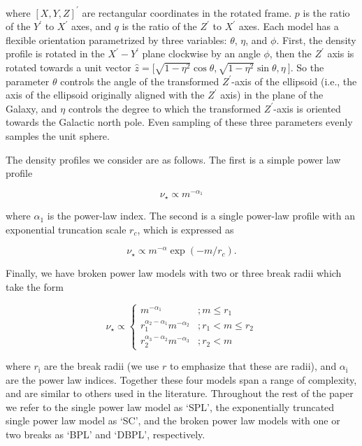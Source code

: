 \noindent where $[X,Y,Z]^{\prime}$ are rectangular coordinates in the rotated frame. $p$ is the ratio of the $Y^{\prime}$ to $X^{\prime}$ axes, and $q$ is the ratio of the $Z^{\prime}$ to $X^{\prime}$ axes. Each model has a flexible orientation parametrized by three variables: $\theta$, $\eta$, and $\phi$. First, the density profile is rotated in the $X^{\prime}-Y^{\prime}$ plane clockwise by an angle $\phi$, then the $Z^{\prime}$ axis is rotated towards a unit vector $\hat{z} = \big[ \sqrt{ 1-\eta^{2} } \cos\theta, \sqrt{ 1-\eta^{2} } \sin\theta, \eta \  \big]$. So the parameter $\theta$ controls the angle of the transformed $Z^{\prime}$-axis of the ellipsoid (i.e., the axis of the ellipsoid originally aligned with the $Z^{\prime}$ axis) in the plane of the Galaxy, and $\eta$ controls the degree to which the transformed $Z^{\prime}$-axis is oriented towards the Galactic north pole. Even sampling of these three parameters evenly samples the unit sphere. 

The density profiles we consider are as follows. The first is a simple power law profile

\begin{equation}
\label{ch3:eq:single-power-law}
\nu_{\star} \propto m^{-\alpha_{1}}
\end{equation}

\noindent where $\alpha_{1}$ is the power-law index. The second is a single power-law profile with an exponential truncation scale $r_{c}$, which is expressed as 

\begin{equation}
\label{ch3:eq:exp-truncated-power-law}
\nu_{\star} \propto m^{-\alpha} \exp(-m/r_{c}) .
\end{equation}

\noindent Finally, we have broken power law models with two or three break radii which take the form

\begin{equation}
\label{ch3:eq:broken-power-law}
\nu_{\star} \propto 
\begin{cases}
m^{-\alpha_{1}} & ; m \leq r_{1} \\
r_{1}^{\alpha_{2}-\alpha_{1}} m^{-\alpha_{2}} & ; r_{1} < m \leq r_{2} \\
r_{2}^{\alpha_{3}-\alpha_{2}} m^{-\alpha_{3}} & ; r_{2} < m
\end{cases}
\end{equation}


\noindent where $r_\mathrm{i}$ are the break radii (we use $r$ to emphasize that these are radii), and $\alpha_\mathrm{i}$ are the power law indices. Together these four models span a range of complexity, and are similar to others used in the literature. Throughout the rest of the paper we refer to the single power law model as `SPL', the exponentially truncated single power law model as `SC', and the broken power law models with one or two breaks as `BPL' and `DBPL', respectively.

